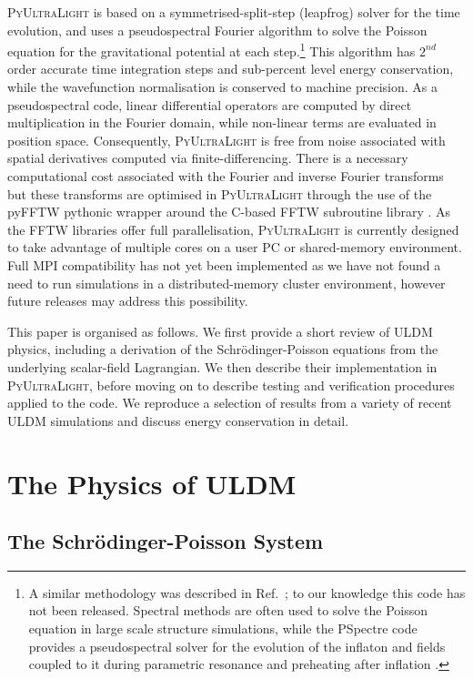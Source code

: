 \documentclass[a4paper,11pt]{article}
\newcommand{\PyUltraLight}{\textsc{PyUltraLight}\xspace}
\begin{document}
\PyUltraLight is based on a symmetrised-split-step (leapfrog) solver for the time evolution, and uses a pseudospectral Fourier algorithm to solve the Poisson equation for the gravitational potential at each step.\footnote{A similar methodology was described in Ref.~\cite{Paredes2016}; to our knowledge this code has not been released. Spectral methods are often used to solve the Poisson equation in large scale structure simulations, while the {\sc PSpectre} code \cite{Easther:2010qz} provides a pseudospectral solver for the evolution of the inflaton  and fields coupled to it during parametric resonance and preheating after inflation \cite{Amin:2010dc,Amin:2011hj,Zhou:2013tsa}.} This algorithm has $2^{nd}$ order accurate time integration steps and sub-percent level energy conservation, while the wavefunction normalisation  is conserved to machine precision. As a pseudospectral code, linear differential operators are computed by direct multiplication in the Fourier domain, while non-linear terms are evaluated in position space. Consequently, \PyUltraLight is free from noise associated with spatial derivatives computed via finite-differencing. There is a necessary computational cost associated with the Fourier and inverse Fourier transforms but these transforms are optimised in \PyUltraLight through the use of the pyFFTW pythonic wrapper around the C-based FFTW subroutine library \cite{pyfftw,fftw}. As the FFTW libraries offer full parallelisation, \PyUltraLight is currently designed to take advantage of multiple cores on a user PC or shared-memory environment. Full MPI compatibility has not yet been implemented as we have not found a need to run simulations in a distributed-memory cluster environment, however future releases may address this possibility. 

This paper is organised as follows. We first provide a short review of ULDM physics, including a derivation of the Schr{\"o}dinger-Poisson equations from the underlying scalar-field Lagrangian. We then describe their implementation in \PyUltraLight, before moving on to describe testing and verification procedures applied to the code. We reproduce a selection of results from a variety of recent ULDM simulations and discuss energy conservation in detail. 


\section{The Physics of ULDM}\label{sec:physics}

\subsection{The Schr{\"o}dinger-Poisson System}
\end{document}
